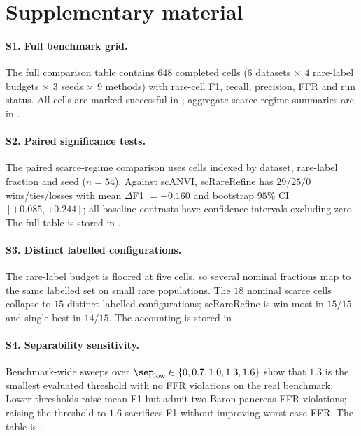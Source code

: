 \section{Supplementary material}
\label{sec:appendix}

\paragraph{S1. Full benchmark grid.} The full comparison table contains $648$ completed cells
($6$ datasets $\times$ $4$ rare-label budgets $\times$ $3$ seeds $\times$ $9$ methods) with rare-cell F1, recall,
precision, FFR and run status. All cells are marked successful in
; aggregate scarce-regime summaries are in
.

\paragraph{S2. Paired significance tests.} The paired scarce-regime comparison uses cells indexed by dataset,
rare-label fraction and seed ($n=54$). Against scANVI, scRareRefine has $29/25/0$ wins/ties/losses with mean
$\Delta$F1 $=+0.160$ and bootstrap $95\%$ CI $[+0.085,+0.244]$; all baseline contrasts have confidence intervals
excluding zero. The full table is stored in .

\paragraph{S3. Distinct labelled configurations.} The rare-label budget is floored at five cells, so several nominal
fractions map to the same labelled set on small rare populations. The $18$ nominal scarce cells collapse to $15$
distinct labelled configurations; scRareRefine is win-most in $15/15$ and single-best in $14/15$. The accounting is
stored in .

\paragraph{S4. Separability sensitivity.} Benchmark-wide sweeps over
\(\sep_{\mathrm{low}}\in\{0,0.7,1.0,1.3,1.6\}\) show that $1.3$ is the smallest evaluated threshold with no FFR
violations on the real benchmark. Lower thresholds raise mean F1 but admit two Baron-pancreas FFR violations; raising
the threshold to $1.6$ sacrifices F1 without improving worst-case FFR. The table is
.


